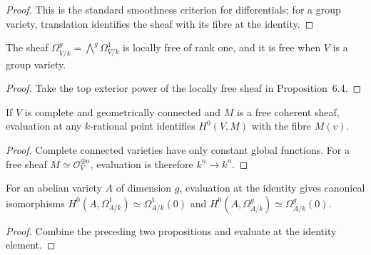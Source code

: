 \begin{proof}

This is the standard smoothness criterion for differentials; for a group
variety, translation identifies the sheaf with its fibre at the identity.

\end{proof}


\begin{corollary}
\label{cor:milne-height-finite-maps}

The sheaf $\Omega^g_{V/k}=\bigwedge^g\Omega^1_{V/k}$ is locally free of rank
one, and it is free when $V$ is a group variety.
\end{corollary}

\begin{proof}

Take the top exterior power of the locally free sheaf in Proposition~6.4.

\end{proof}


\begin{proposition}
\label{prop:milne-bounded-complete-height}

If $V$ is complete and geometrically connected and $M$ is a free coherent
sheaf, evaluation at any $k$-rational point identifies $H^0(V,M)$ with the
fibre $M(v)$.
\end{proposition}

\begin{proof}

Complete connected varieties have only constant global functions.  For a free
sheaf $M\simeq\mathcal O_V^{\oplus n}$, evaluation is therefore $k^n\to k^n$.

\end{proof}


\begin{proposition}
\label{prop:milne-isogeny-height-estimate}

For an abelian variety $A$ of dimension $g$, evaluation at the identity gives
canonical isomorphisms $H^0(A,\Omega^1_{A/k})\simeq\Omega^1_{A/k}(0)$ and
$H^0(A,\Omega^g_{A/k})\simeq\Omega^g_{A/k}(0)$.
\end{proposition}

\begin{proof}

Combine the preceding two propositions and evaluate at the identity element.

\end{proof}


